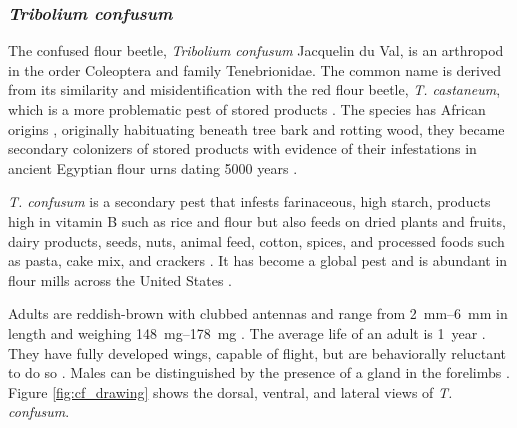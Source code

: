 \documentclass[../Vibro-Acoustic Signatures and Detection Algorithms for Stored Product Insects.tex]{subfiles}
\begin{document}
\newpage
\subsubsection{\textit{Tribolium confusum}}

The confused flour beetle, \textit{Tribolium confusum} Jacquelin du Val, is an arthropod in the order Coleoptera and family Tenebrionidae. The common name is derived from its similarity and misidentification with the red flour beetle, \textit{T. castaneum}, which is a more problematic pest of stored products \cite{baldwinConfusedFlourBeetle2005}. The species has African origins \cite{tyagiPostHarvestStoredProduct2019}, originally  habituating beneath tree bark and rotting wood, they became secondary colonizers of stored products with evidence of their infestations in ancient Egyptian flour urns dating 5000 years \cite{pointerTriboliumBeetlesModel2021}.

\textit{T. confusum} is a secondary pest that infests farinaceous, high starch, products high in vitamin B such as rice and flour but also feeds on dried plants and fruits, dairy products, seeds, nuts, animal feed, cotton, spices, and processed foods such as pasta, cake mix, and crackers \cite{fordResearchPopulationsTribolium1937,tyagiPostHarvestStoredProduct2019,kavallieratosBiologicalFeaturesPopulation2020}. It has become a global pest and is abundant in flour mills across the United States \cite{StoredGrainInsects2016}.

Adults are reddish-brown with clubbed antennas and range from \SIrange{2}{6}{\milli\meter} in length \cite{baldwinConfusedFlourBeetle2020,tyagiPostHarvestStoredProduct2019} and weighing \SIrange{148}{178}{\milli\gram} \cite{fordResearchPopulationsTribolium1937}. The average life of an adult is \SI{1}{year} \cite{tyagiPostHarvestStoredProduct2019}. They have fully developed wings, capable of flight, but are behaviorally reluctant to do so \cite{kavallieratosBiologicalFeaturesPopulation2020}. Males can be distinguished by the presence of a gland in the forelimbs \cite{pointerTriboliumBeetlesModel2021}. Figure \ref{fig:cf_drawing} shows the dorsal, ventral, and lateral views of \textit{T. confusum}.
\end{document}
